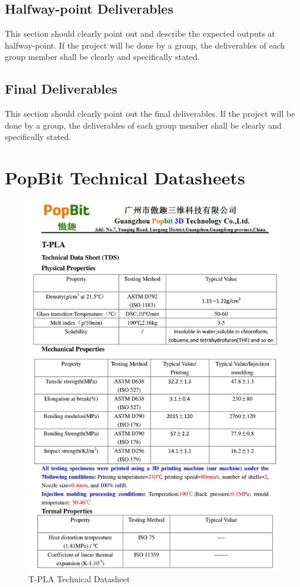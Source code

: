 \documentclass[english]{upeeei}
\begin{document}
\section{Halfway-point Deliverables}

This section should clearly point out and describe the expected outputs
at halfway-point. If the project will be done by a group, the deliverables
of each group member shall be clearly and specifically stated. 

\section{Final Deliverables}

This section should clearly point out the final deliverables. If the
project will be done by a group, the deliverables of each group member
shall be clearly and specifically stated.

\cleardoublepage{}


\nocite{*}


\cleardoublepage{}

\appendix

\chapter{PopBit Technical Datasheets}

\begin{figure}[H]
\begin{centering}
\includegraphics[width=0.8\columnwidth]{images/tpla}
\par\end{centering}
\caption{T-PLA Technical Datasheet\label{fig:tpla}}
\end{figure}
\end{document}
